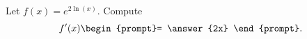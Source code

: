 \documentclass{ximera}
\author{Steven Gubkin}
\begin{document}
\begin{exercise}

Let $f(x) = e^{2\ln(x)}$. Compute
\[
f'(x) \begin{prompt}= \answer{2x}
\end{prompt}.
\]



\end{exercise}
\end{document}

